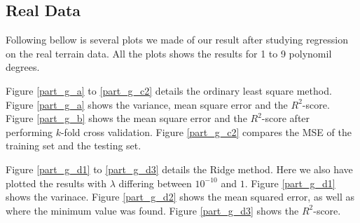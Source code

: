 \documentclass[a4paper,10pt,english]{article}
\begin{document}





%






\subsection{Real Data}


Following bellow is several plots we made of our result after studying regression on the real terrain data. All the plots shows the results for 1 to 9 polynomil degrees.

Figure \ref{part_g_a} to \ref{part_g_c2} details the ordinary least square method.
Figure \ref{part_g_a} shows the variance, mean square error and the $R^2$-score.
Figure \ref{part_g_b} shows the mean square error and the $R^2$-score after performing $k$-fold cross validation. 
Figure \ref{part_g_c2} compares the MSE of the training set and the testing set.

Figure \ref{part_g_d1} to \ref{part_g_d3} details the Ridge method. Here we also have plotted the results with $\lambda$ differing between $10^{-10}$ and $1$.
Figure \ref{part_g_d1} shows the varinace.
Figure \ref{part_g_d2} shows the mean squared error, as well as where the minimum value was found.
Figure \ref{part_g_d3} shows the $R^2$-score.
\end{document}
